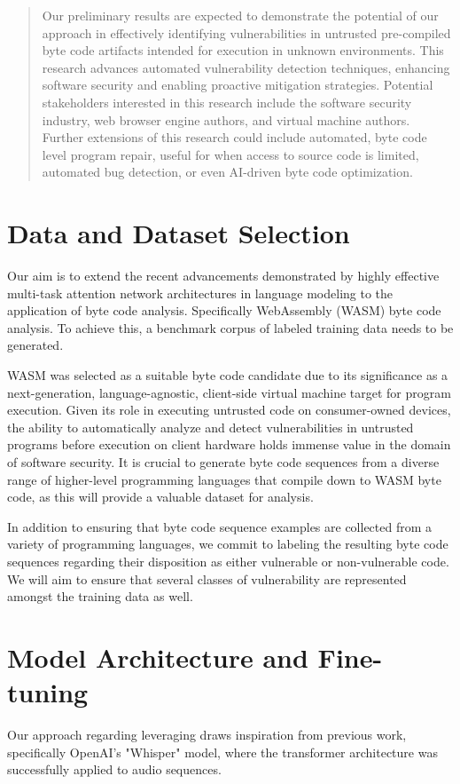\documentclass{article}
\begin{document}
\begin{abstract}
Our preliminary results are expected to demonstrate the potential of our approach in effectively identifying vulnerabilities in untrusted pre-compiled byte code artifacts intended for execution in unknown environments. This research advances automated vulnerability detection techniques, enhancing software security and enabling proactive mitigation strategies. Potential stakeholders interested in this research include the software security industry, web browser engine authors, and virtual machine authors. Further extensions of this research could include automated, byte code level program repair, useful for when access to source code is limited, automated bug detection, or even AI-driven byte code optimization.
\end{abstract}


\section{Data and Dataset Selection}
Our aim is to extend the recent advancements demonstrated by highly effective multi-task attention network architectures in language modeling to the application of byte code analysis. Specifically WebAssembly (WASM) byte code analysis. To achieve this, a benchmark corpus of labeled training data needs to be generated.

WASM was selected as a suitable byte code candidate due to its significance as a next-generation, language-agnostic, client-side virtual machine target for program execution. Given its role in executing untrusted code on consumer-owned devices, the ability to automatically analyze and detect vulnerabilities in untrusted programs before execution on client hardware holds immense value in the domain of software security. It is crucial to generate byte code sequences from a diverse range of higher-level programming languages that compile down to WASM byte code, as this will provide a valuable dataset for analysis.

In addition to ensuring that byte code sequence examples are collected from a variety of programming languages, we commit to labeling the resulting byte code sequences regarding their disposition as either vulnerable or non-vulnerable code. We will aim to ensure that several classes of vulnerability are represented amongst the training data as well.

\section{Model Architecture and Fine-tuning}
Our approach regarding leveraging draws inspiration from previous work, specifically OpenAI's "Whisper" model, where the transformer architecture was successfully applied to audio sequences.
\end{document}
